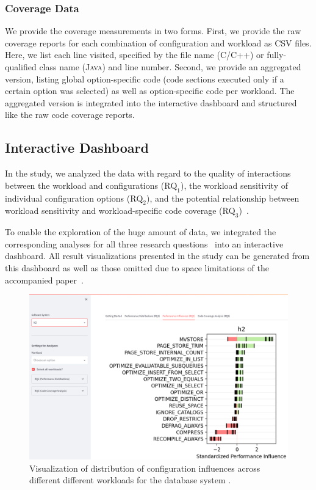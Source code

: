 {\subsubsection{Coverage Data}
We provide the coverage measurements in two forms. First, we provide the raw coverage reports for each combination of configuration and workload as CSV files. Here, we list each line visited, specified by the file name (\textsc{C/C++}) or fully-qualified class name (\textsc{Java}) and line number. Second, we provide an aggregated version, listing global option-specific code (code sections executed only if a certain option was selected) as well as option-specific code per workload. The aggregated version is integrated into the interactive dashboard and structured like the raw code coverage reports.


\color{black}
\subsection{Interactive Dashboard}
In the study, we analyzed the data with regard to the quality of interactions between the workload and configurations ($\text{RQ}_\text{1}$), the workload sensitivity of individual configuration options ($\text{RQ}_\text{2}$), and the potential relationship between workload sensitivity and workload-specific code coverage ($\text{RQ}_\text{3}$)~\cite{muhlbauer_workload_2023}. 

To enable the exploration of the huge amount of data, we integrated the corresponding analyses for all three research questions~\cite{muhlbauer_workload_2023} into an interactive dashboard. All result visualizations presented in the study can be generated from this dashboard as well as those omitted due to space limitations of the accompanied paper~\cite{muhlbauer_workload_2023}. 
\begin{figure}[]
	\centering
	\includegraphics[width=0.95\linewidth]{images/rq2.png}
	\caption{Visualization of distribution of configuration influences across different different workloads for the database system \htwo.}
	\label{fig:dashboard}
\end{figure}

}
